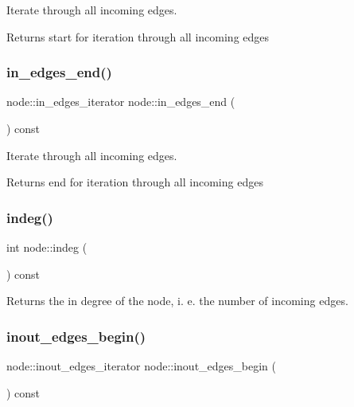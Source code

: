 Iterate through all incoming edges.

\begin{DoxyReturn}{Returns}
start for iteration through all incoming edges 
\end{DoxyReturn}
\mbox{\label{classnode_a785cd330f8b4c5c47d3b6e936a7e744e}} 
\subsubsection{\texorpdfstring{in\+\_\+edges\+\_\+end()}{in\_edges\_end()}}
{\footnotesize\ttfamily node\+::in\+\_\+edges\+\_\+iterator node\+::in\+\_\+edges\+\_\+end (\begin{DoxyParamCaption}{ }\end{DoxyParamCaption}) const}

Iterate through all incoming edges.

\begin{DoxyReturn}{Returns}
end for iteration through all incoming edges 
\end{DoxyReturn}
\mbox{\label{classnode_a749bfd1316584b96f8c9b0e44ad512f0}} 
\subsubsection{\texorpdfstring{indeg()}{indeg()}}
{\footnotesize\ttfamily int node\+::indeg (\begin{DoxyParamCaption}{ }\end{DoxyParamCaption}) const}

Returns the in degree of the node, i. e. the number of incoming edges. \mbox{\label{classnode_a8677f4dc2acfb64310de1ea866c17340}} 
\subsubsection{\texorpdfstring{inout\+\_\+edges\+\_\+begin()}{inout\_edges\_begin()}}
{\footnotesize\ttfamily node\+::inout\+\_\+edges\+\_\+iterator node\+::inout\+\_\+edges\+\_\+begin (\begin{DoxyParamCaption}{ }\end{DoxyParamCaption}) const}

